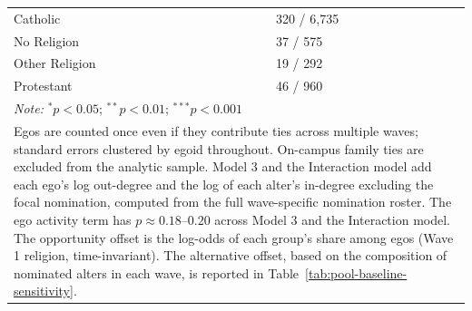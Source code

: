 \begin{table}[htbp]
{\begin{tabular}[t]{lllll}
Catholic & \multicolumn{4}{l}{320 / 6,735} \\
No Religion & \multicolumn{4}{l}{37 / 575} \\
Other Religion & \multicolumn{4}{l}{19 / 292} \\
Protestant & \multicolumn{4}{l}{46 / 960} \\
\bottomrule
\multicolumn{5}{l}{\rule{0pt}{1em}\textit{Note:} $^{*} p < 0.05$; $^{**} p < 0.01$; $^{***} p < 0.001$}\\
\multicolumn{5}{p{1.0\textwidth}}{\footnotesize Egos are counted once even if they contribute ties across multiple waves; standard errors clustered by egoid throughout. On-campus family ties are excluded from the analytic sample. Model 3 and the Interaction model add each ego's log out-degree and the log of each alter's in-degree excluding the focal nomination, computed from the full wave-specific nomination roster. The ego activity term has $p \approx 0.18$--$0.20$ across Model 3 and the Interaction model. The opportunity offset is the log-odds of each group's share among egos (Wave 1 religion, time-invariant). The alternative offset, based on the composition of nominated alters in each wave, is reported in Table~\ref{tab:pool-baseline-sensitivity}.}\\
\end{tabular}
}
\end{table}
